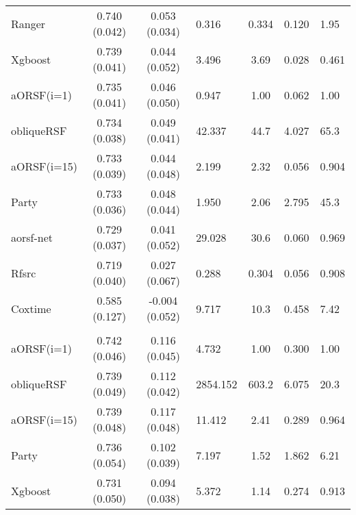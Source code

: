 \documentclass[twoside,11pt]{article}\usepackage[]{graphicx}\usepackage[]{color}
\newenvironment{knitrout}{}{} %
\begin{document}
\begin{knitrout}
\begin{longtable}{lcclccl}
\endfoot
\bottomrule
\endlastfoot
\addlinespace[0.3em]
\hline
\multicolumn{7}{l}{\textit{\textbf{actg}}}\\
\hline
\hspace{1em}Ranger & 0.740 (0.042) & 0.053 (0.034) & 0.316 & 0.334 & 0.120 & 1.95\\
\hspace{1em}Xgboost & 0.739 (0.041) & 0.044 (0.052) & 3.496 & 3.69 & 0.028 & 0.461\\
\hspace{1em}aORSF(i=1) & 0.735 (0.041) & 0.046 (0.050) & 0.947 & 1.00 & 0.062 & 1.00\\
\hspace{1em}obliqueRSF & 0.734 (0.038) & 0.049 (0.041) & 42.337 & 44.7 & 4.027 & 65.3\\
\hspace{1em}aORSF(i=15) & 0.733 (0.039) & 0.044 (0.048) & 2.199 & 2.32 & 0.056 & 0.904\\
\hspace{1em}Party & 0.733 (0.036) & 0.048 (0.044) & 1.950 & 2.06 & 2.795 & 45.3\\
\hspace{1em}aorsf-net & 0.729 (0.037) & 0.041 (0.052) & 29.028 & 30.6 & 0.060 & 0.969\\
\hspace{1em}Rfsrc & 0.719 (0.040) & 0.027 (0.067) & 0.288 & 0.304 & 0.056 & 0.908\\
\hspace{1em}Coxtime & 0.585 (0.127) & -0.004 (0.052) & 9.717 & 10.3 & 0.458 & 7.42\\
\addlinespace[0.3em]
\hline
\multicolumn{7}{l}{\textit{\textbf{breast}}}\\
\hline
\hspace{1em}aORSF(i=1) & 0.742 (0.046) & 0.116 (0.045) & 4.732 & 1.00 & 0.300 & 1.00\\
\hspace{1em}obliqueRSF & 0.739 (0.049) & 0.112 (0.042) & 2854.152 & 603.2 & 6.075 & 20.3\\
\hspace{1em}aORSF(i=15) & 0.739 (0.048) & 0.117 (0.048) & 11.412 & 2.41 & 0.289 & 0.964\\
\hspace{1em}Party & 0.736 (0.054) & 0.102 (0.039) & 7.197 & 1.52 & 1.862 & 6.21\\
\hspace{1em}Xgboost & 0.731 (0.050) & 0.094 (0.038) & 5.372 & 1.14 & 0.274 & 0.913\\

\end{longtable}
\end{knitrout}
\end{document}
